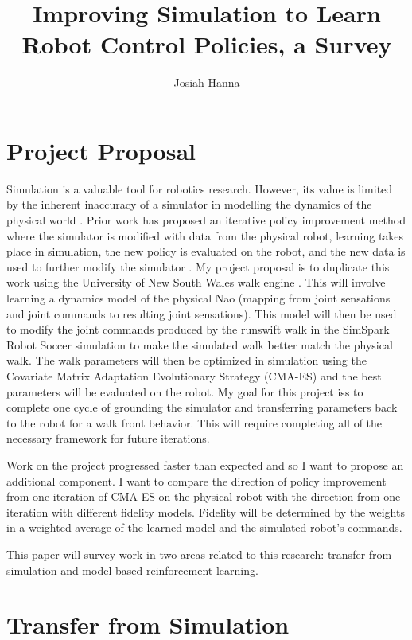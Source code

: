 \documentclass[12 pt]{article}
\author{Josiah Hanna}
\title{Improving Simulation to Learn Robot Control Policies, a Survey}
\begin{document}
\maketitle

\section{Project Proposal}


Simulation is a valuable tool for robotics research. 
However, its value is limited by the inherent inaccuracy of a simulator in modelling the dynamics of the physical world \cite{kober2013reinforcement}. 
Prior work has proposed an iterative policy improvement method where the simulator is modified with data from the physical robot, learning takes place in simulation, the new policy is evaluated on the robot, and the new data is used to further modify the simulator \cite{farchy2013humanoid}.
My project proposal is to duplicate this work using the University of New South Wales walk engine \cite{ashar2014robocup}. 
This will involve learning a dynamics model of the physical Nao (mapping from joint sensations and joint commands to resulting joint sensations). 
This model will then be used to modify the joint commands produced by the runswift walk in the SimSpark Robot Soccer simulation \cite{simspark} to make the simulated walk better match the physical walk. 
The walk parameters will then be optimized in simulation using the Covariate Matrix Adaptation Evolutionary Strategy (CMA-ES)\cite{hansen2011cma} and the best parameters will be evaluated on the robot. 
My goal for this project iss to complete one cycle of grounding the simulator and transferring parameters back to the robot for a walk front behavior. 
This will require completing all of the necessary framework for future iterations.

Work on the project progressed faster than expected and so I want to propose an additional component. I want to compare the direction of policy improvement from one iteration of CMA-ES on the physical robot with the direction from one iteration with different fidelity models. Fidelity will be determined by the weights in a weighted average of the learned model and the simulated robot's commands. 

This paper will survey work in two areas related to this research: transfer from simulation and model-based reinforcement learning.

\section{Transfer from Simulation}
\end{document}
